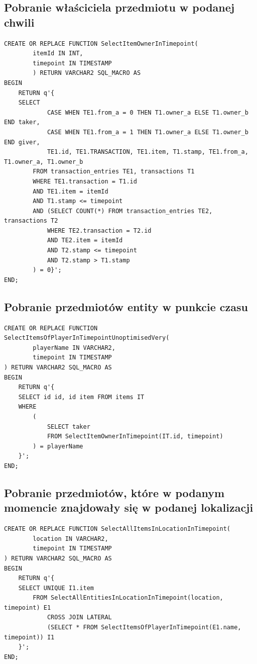 \documentclass[11pt]{article}
\numberwithin{figure}{subsection}
\begin{document}
	
	\subsection{Pobranie właściciela przedmiotu w podanej chwili}
			
		\begin{lstlisting}[caption={Pobranie właściciela przedmiotu w podanej
		chwili},captionpos=b]
CREATE OR REPLACE FUNCTION SelectItemOwnerInTimepoint(
		itemId IN INT,
		timepoint IN TIMESTAMP
		) RETURN VARCHAR2 SQL_MACRO AS
BEGIN
	RETURN q'{
	SELECT
			CASE WHEN TE1.from_a = 0 THEN T1.owner_a ELSE T1.owner_b END taker,
			CASE WHEN TE1.from_a = 1 THEN T1.owner_a ELSE T1.owner_b END giver,
			TE1.id, TE1.TRANSACTION, TE1.item, T1.stamp, TE1.from_a, T1.owner_a, T1.owner_b
		FROM transaction_entries TE1, transactions T1
		WHERE TE1.transaction = T1.id
		AND TE1.item = itemId
		AND T1.stamp <= timepoint
		AND (SELECT COUNT(*) FROM transaction_entries TE2, transactions T2
			WHERE TE2.transaction = T2.id
			AND TE2.item = itemId
			AND T2.stamp <= timepoint
			AND T2.stamp > T1.stamp
		) = 0}';
END;
		\end{lstlisting}
		
	
	\subsection{Pobranie przedmiotów entity w punkcie
		czasu}
			
		\begin{lstlisting}[caption={Pobranie przedmiotów entity w punkcie
		czasu},captionpos=b]
CREATE OR REPLACE FUNCTION SelectItemsOfPlayerInTimepointUnoptimisedVery(
		playerName IN VARCHAR2,
		timepoint IN TIMESTAMP
) RETURN VARCHAR2 SQL_MACRO AS
BEGIN
	RETURN q'{
	SELECT id id, id item FROM items IT
	WHERE
		(
			SELECT taker
			FROM SelectItemOwnerInTimepoint(IT.id, timepoint) 
		) = playerName
	}';
END;
		\end{lstlisting}
		
	
	\subsection{Pobranie przedmiotów, które w podanym momencie znajdowały się w
	podanej lokalizacji}
			
		\begin{lstlisting}[caption={Pobranie przedmiotów, które w podanym
		momencie znajdowały się w podanej lokalizacji},captionpos=b]
CREATE OR REPLACE FUNCTION SelectAllItemsInLocationInTimepoint(
		location IN VARCHAR2,
		timepoint IN TIMESTAMP
) RETURN VARCHAR2 SQL_MACRO AS
BEGIN
	RETURN q'{
	SELECT UNIQUE I1.item
		FROM SelectAllEntitiesInLocationInTimepoint(location, timepoint) E1
			CROSS JOIN LATERAL
			(SELECT * FROM SelectItemsOfPlayerInTimepoint(E1.name, timepoint)) I1
	}';
END;
		\end{lstlisting}
		
\end{document}
